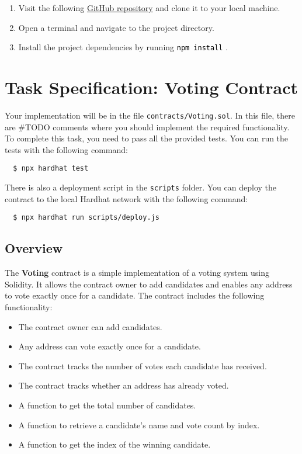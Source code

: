 \documentclass[12pt]{article}
\newcommand{\codegrey}[1]{%
  \texttt{\colorbox{black!4}{\textcolor{black}{#1}}}%
}
\begin{document}
\begin{enumerate}
    \item Visit the following \href{https://github.com/radovluk/Smart-Contract-Exercise/tree/main/02-Decentralized-Voting-System/task/task-code}{GitHub repository} and clone it to your local machine.
    \item Open a terminal and navigate to the project directory.
    \item Install the project dependencies by running \codegrey{npm install}.
\end{enumerate}

\section{Task Specification: Voting Contract}

Your implementation will be in the file \texttt{contracts/Voting.sol}. In this file, there are \#TODO comments where you should implement the required functionality. To complete this task, you need to pass all the provided tests. You can run the tests with the following command:

\begin{verbatim}
  $ npx hardhat test
\end{verbatim}

There is also a deployment script in the \texttt{scripts} folder. You can deploy the contract to the local Hardhat network with the following command:

\begin{verbatim}
  $ npx hardhat run scripts/deploy.js
\end{verbatim}

\subsection{Overview}

The \textbf{Voting} contract is a simple implementation of a voting system using Solidity. It allows the contract owner to add candidates and enables any address to vote exactly once for a candidate. The contract includes the following functionality:
\begin{itemize}
    \item The contract owner can add candidates.
    \item Any address can vote exactly once for a candidate.
    \item The contract tracks the number of votes each candidate has received.
    \item The contract tracks whether an address has already voted.
    \item A function to get the total number of candidates.
    \item A function to retrieve a candidate's name and vote count by index.
    \item A function to get the index of the winning candidate.
\end{itemize}
\end{document}
